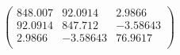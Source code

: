 \documentclass{article}
\begin{document}
\[\left(
\begin{array}{ccc}
 848.007 & 92.0914 & 2.9866 \\
 92.0914 & 847.712 & -3.58643 \\
 2.9866 & -3.58643 & 76.9617 \\
\end{array}
\right)\]
\end{document}
